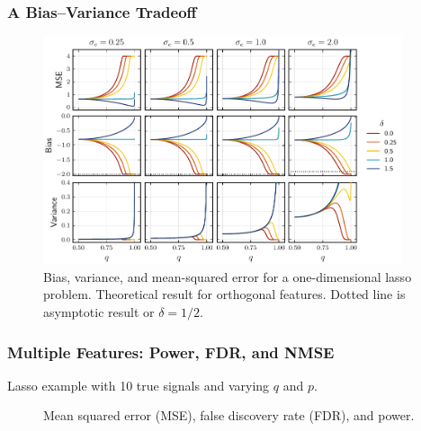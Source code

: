 \documentclass[10pt]{beamer}
\begin{document}
\begin{frame}[c]
  \frametitle{A Bias--Variance Tradeoff}

  \begin{figure}
    \centering
    \includegraphics[width=0.94\textwidth]{figures/bias-var-onedim.pdf}
    \caption{%
      Bias, variance, and mean-squared error for a one-dimensional lasso problem. Theoretical result for orthogonal features. Dotted line is asymptotic result or \(\delta = 1/2\).
    }
  \end{figure}

\end{frame}

\begin{frame}[c]
  \frametitle{Multiple Features: Power, FDR, and NMSE}

  Lasso example with 10 true signals and varying \(q\) and \(p\).

  \begin{figure}[htpb]
    \centering
    \hfill\pause%
    \caption{%
      Mean squared error (MSE), false discovery rate (FDR), and power.
    }
  \end{figure}
\end{frame}
\end{document}
